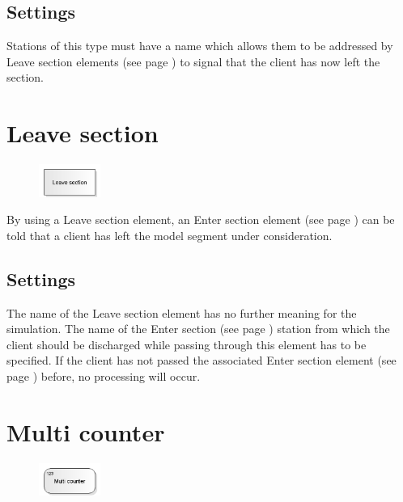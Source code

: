 \subsection*{Settings}

Stations of this type must have a name which allows them to be addressed by
Leave section elements (see page \pageref{ref:ModelElementSectionEnd}) to signal
that the client has now left the section.


\section{Leave section}
\label{ref:ModelElementSectionEnd}

\begin{figure}
\vspace{-22pt}
\includegraphics[width=2cm]{imageModelElementSectionEnd.png}
\vspace{-22pt}
\end{figure}

By using a Leave section element, an Enter section element (see page \pageref{ref:ModelElementSectionStart}) 
can be told that a client has left the model segment under consideration.

\subsection*{Settings}

The name of the Leave section element has no further meaning for the simulation.
The name of the Enter section (see page \pageref{ref:ModelElementSectionStart}) station
from which the client should be discharged while passing through this element has
to be specified. If the client has not passed the associated
Enter section element (see page \pageref{ref:ModelElementSectionStart}) before,
no processing will occur.


\section{Multi counter}
\label{ref:ModelElementCounterMulti}

\begin{figure}
\vspace{-22pt}
\includegraphics[width=2cm]{imageModelElementCounterMulti.png}
\vspace{-22pt}
\end{figure}

